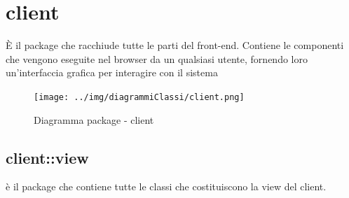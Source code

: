 \section{client}
È il package che racchiude tutte le parti del front-end. Contiene le componenti che vengono eseguite nel browser da un qualsiasi utente, fornendo loro un’interfaccia grafica per interagire con il sistema\begin{center}
		\begin{figure}[H]
			\centering \texttt{[image: ../img/diagrammiClassi/client.png]}
			\caption{Diagramma package - client}
		\end{figure}
	\end{center}\subsection{client::view}
è il package che contiene tutte le classi che costituiscono la view del client. 
